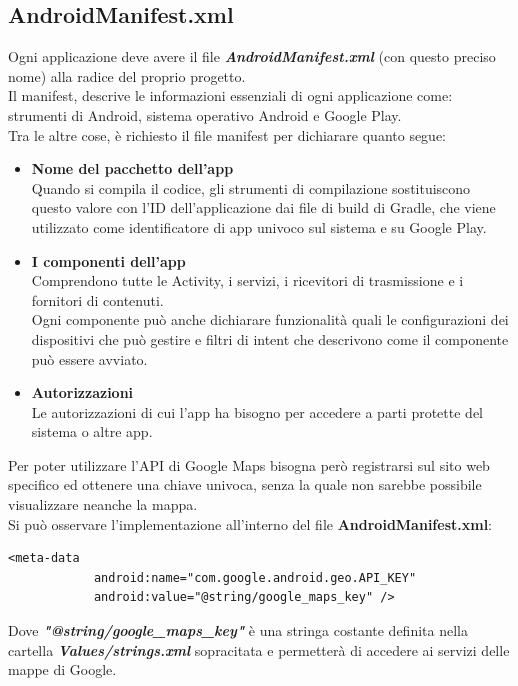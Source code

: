 \subsection{AndroidManifest.xml}
\label{manifest}
Ogni applicazione deve avere il file \textit{\textbf{AndroidManifest.xml}} (con questo preciso nome) alla radice del proprio progetto.
\\Il manifest, descrive le informazioni essenziali di ogni applicazione come: strumenti di Android, sistema operativo Android e Google Play.
\\Tra le altre cose, è richiesto il file manifest per dichiarare quanto segue:
\begin{itemize}
    \item \textbf{Nome del pacchetto dell'app}\\
    Quando si compila il codice, gli strumenti di compilazione sostituiscono questo valore con l'ID dell'applicazione dai file di build di Gradle, che viene utilizzato come identificatore di app univoco sul sistema e su Google Play. 
    \item \textbf{I componenti dell'app}\\
    Comprendono tutte le Activity, i servizi, i ricevitori di trasmissione e i fornitori di contenuti.\\
    Ogni componente può anche dichiarare funzionalità quali le configurazioni dei dispositivi che può gestire e filtri di intent che descrivono come il componente può essere avviato.
    
    \item \textbf{Autorizzazioni}\\
    Le autorizzazioni di cui l'app ha bisogno per accedere a parti protette del sistema o altre app.
\end{itemize}
Per poter utilizzare l'API di Google Maps bisogna però registrarsi sul sito web specifico ed ottenere una chiave univoca, senza la quale non sarebbe possibile visualizzare neanche la mappa.\\
Si può osservare l'implementazione all'interno del file \textbf{AndroidManifest.xml}:\\
\begin{lstlisting}
<meta-data
            android:name="com.google.android.geo.API_KEY"
            android:value="@string/google_maps_key" />
\end{lstlisting}
Dove \textit{\textbf{"@string/google\_maps\_key"}} è una stringa costante definita nella cartella \textit{\textbf{Values/strings.xml}} sopracitata e permetterà di accedere ai servizi delle mappe di Google.
